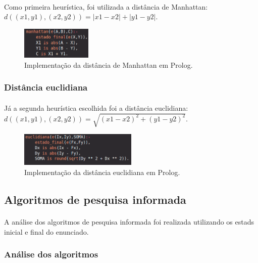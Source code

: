 \documentclass{article}
\begin{document}
\paragraph{} Como primeira heurística, foi utilizada a distância de Manhattan: $d((x1, y1), (x2, y2)) = |x1 - x2| + |y1 - y2|$.

\begin{figure}[h]
\centering
\includegraphics[width=0.3\textwidth]{manhattan.png}
\caption{\label{fig:man}Implementação da distância de Manhattan em Prolog.}
\end{figure}

\subsubsection{Distância euclidiana}
\paragraph{} Já a segunda heurística escolhida foi a distância euclidiana: $d((x1, y1), (x2, y2)) = \sqrt{(x1-x2)^2 + (y1-y2)^2}$.

\begin{figure}[h]
\centering
\includegraphics[width=0.5\textwidth]{euclidiana.png}
\caption{\label{fig:euc}Implementação da distância euclidiana em Prolog.}
\end{figure}

\subsection{Algoritmos de pesquisa informada}
\paragraph{} A análise dos algoritmos de pesquisa informada foi realizada utilizando os estads inicial e final do enunciado.

\subsubsection{Análise dos algoritmos}
\end{document}
